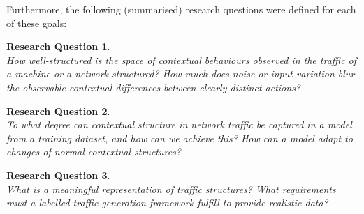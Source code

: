 \documentclass[a4paper,12pt,twoside]{article}
\newtheorem{rquestion}{Research Question}
\begin{document}
Furthermore, the following (summarised) research questions were defined for each of these goals:

\begin{rquestion}\ \\ 
How well-structured is the space of contextual behaviours observed in the traffic of a machine or a network structured? How much does noise or input variation blur the observable contextual differences between clearly distinct actions?

\end{rquestion}


\begin{rquestion}\ \\
To what degree can contextual structure in network traffic be captured in a model from a training dataset, and how can we achieve this? How can a model adapt to changes of normal contextual structures?
\end{rquestion}



\begin{rquestion}\ \\
What is a meaningful representation of traffic structures? What requirements must a labelled traffic generation framework fulfill to provide realistic data?
\end{rquestion}
\end{document}
